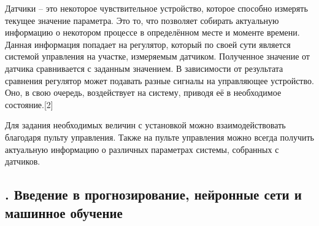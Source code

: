 {  \par \redline Датчики {--} это некоторое чувствительное устройство, которое способно измерять текущее значение параметра. Это то, что позволяет собирать актуальную информацию о некотором процессе в определённом месте и моменте времени. Данная информация попадает на регулятор, который по своей сути является системой управления на участке, измеряемым датчиком. Полученное значение от датчика сравнивается с заданным значением. В зависимости от результата сравнения регулятор может подавать разные сигналы на управляющее устройство. Оно, в свою очередь, воздействует на систему, приводя её в необходимое состояние.[2]

  \par \redline Для задания необходимых величин с установкой можно взаимодействовать благодаря пульту управления. Также на пульте управления можно всегда получить актуальную информацию о различных параметрах системы, собранных с датчиков.

  \par
}

\subtitlespace

\subsection*{
  \gostTitleFont
  \redline
  \thechaptercntr .\thesubchaptercntr \spc
  Введение в прогнозирование, нейронные сети и машинное обучение
} \addtocounter{subchaptercntr}{1}

\subtitlespace

